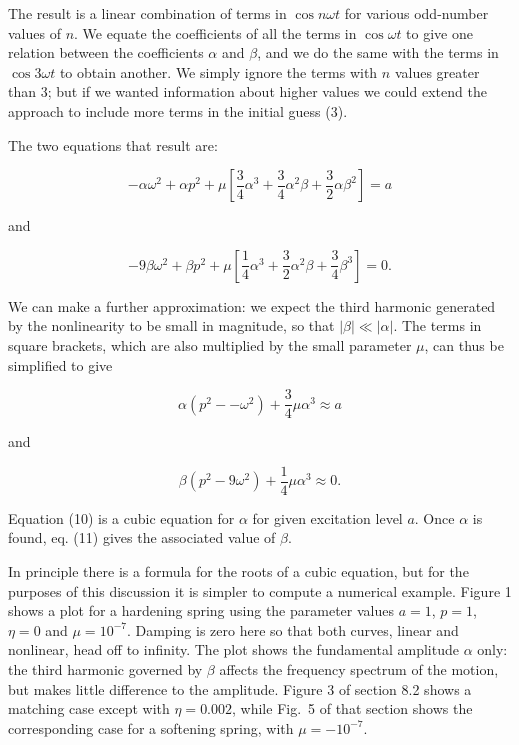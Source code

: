  The result is a linear combination of terms in $\cos n\omega t$ for various 
  odd-number values of $n$. We equate the coefficients of all the terms in 
  $\cos \omega t$ to give one relation between the coefficients $\alpha$ and 
  $\beta$, and we do the same with the terms in $\cos 3 \omega t$ to obtain 
  another. We simply ignore the terms with $n$ values greater than 3; but if we 
  wanted information about higher values we could extend the approach to 
  include more terms in the initial guess (3). 

  The two equations that result are: 

  $$-\alpha \omega^2 + \alpha p^2 + \mu \left[\frac{3}{4}\alpha^3 + 
  \frac{3}{4}\alpha^2 \beta +\frac{3}{2}\alpha \beta^2 \right] = a \tag{8}$$ 

  and 

  $$-9\beta \omega^2+ \beta p^2 + \mu \left[\frac{1}{4}\alpha^3 + 
  \frac{3}{2}\alpha^2 \beta +\frac{3}{4} \beta^3 \right] = 0 . \tag{9}$$ 

  We can make a further approximation: we expect the third harmonic generated 
  by the nonlinearity to be small in magnitude, so that $ |\beta | \ll |\alpha 
  |$. The terms in square brackets, which are also multiplied by the small 
  parameter $\mu$, can thus be simplified to give 

  $$\alpha (p^2 -- \omega^2) +\dfrac{3}{4} \mu \alpha^3 \approx a \tag{10}$$ 

  and 

  $$\beta (p^2-9 \omega^2) + \dfrac{1}{4} \mu \alpha^3 \approx 0 . \tag{11}$$ 

  Equation (10) is a cubic equation for $\alpha$ for given excitation level 
  $a$. Once $\alpha$ is found, eq. (11) gives the associated value of $\beta$. 

  In principle there is a formula for the roots of a cubic equation, but for 
  the purposes of this discussion it is simpler to compute a numerical example. 
  Figure 1 shows a plot for a hardening spring using the parameter values 
  $a=1$, $p=1$, $\eta =0$ and $\mu = 10^{-7}$. Damping is zero here so that 
  both curves, linear and nonlinear, head off to infinity. The plot shows the 
  fundamental amplitude $\alpha$ only: the third harmonic governed by $\beta$ 
  affects the frequency spectrum of the motion, but makes little difference to 
  the amplitude. Figure 3 of section 8.2 shows a matching case except with 
  $\eta = 0.002$, while Fig.\ 5 of that section shows the corresponding case 
  for a softening spring, with $\mu = -10^{-7}$. 

